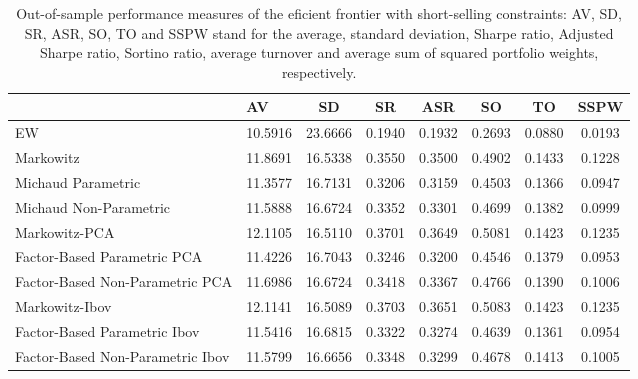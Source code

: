 \begin{table}

\caption{\label{tab:empirical_ef_2}Out-of-sample performance measures of the eficient frontier with short-selling constraints: AV, SD, SR, ASR, SO, TO and SSPW stand for the average, standard deviation, Sharpe ratio, Adjusted Sharpe ratio, Sortino ratio, average turnover and average sum of squared portfolio weights, respectively.}
\centering
\begin{tabular}[t]{l|l|c|c|c|c|c|c}
\hline
  & AV & SD & SR & ASR & SO & TO & SSPW\\
\hline
EW & 10.5916 & 23.6666 & 0.1940 & 0.1932 & 0.2693 & 0.0880 & 0.0193\\
\hline
Markowitz & 11.8691 & 16.5338 & 0.3550 & 0.3500 & 0.4902 & 0.1433 & 0.1228\\
\hline
Michaud Parametric & 11.3577 & 16.7131 & 0.3206 & 0.3159 & 0.4503 & 0.1366 & 0.0947\\
\hline
Michaud Non-Parametric & 11.5888 & 16.6724 & 0.3352 & 0.3301 & 0.4699 & 0.1382 & 0.0999\\
\hline
Markowitz-PCA & 12.1105 & 16.5110 & 0.3701 & 0.3649 & 0.5081 & 0.1423 & 0.1235\\
\hline
Factor-Based Parametric PCA & 11.4226 & 16.7043 & 0.3246 & 0.3200 & 0.4546 & 0.1379 & 0.0953\\
\hline
Factor-Based Non-Parametric PCA & 11.6986 & 16.6724 & 0.3418 & 0.3367 & 0.4766 & 0.1390 & 0.1006\\
\hline
Markowitz-Ibov & 12.1141 & 16.5089 & 0.3703 & 0.3651 & 0.5083 & 0.1423 & 0.1235\\
\hline
Factor-Based Parametric Ibov & 11.5416 & 16.6815 & 0.3322 & 0.3274 & 0.4639 & 0.1361 & 0.0954\\
\hline
Factor-Based Non-Parametric Ibov & 11.5799 & 16.6656 & 0.3348 & 0.3299 & 0.4678 & 0.1413 & 0.1005\\
\hline
\end{tabular}
\end{table}
